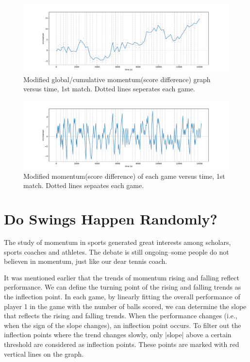 \documentclass[UTF8]{mcmthesis}
\begin{document}
	\begin{figure}[H]
		\centering
		\includegraphics[width=1.0\linewidth]{figs/fig2_0.pdf}
		\caption{Modified global/cumulative momentum(score difference) graph versus time, 1st match. Dotted lines seperates each game.}
		\label{fig:fig2_0}
	\end{figure}
	
	\begin{figure}[H]
		\centering
		\includegraphics[width=1.0\linewidth]{figs/fig3_0.pdf}
		\caption{Modified momentum(score difference) of each game versus time, 1st match. Dotted lines sepaates each game.}
		\label{fig:fig30}
	\end{figure}
	
	\section{Do Swings Happen Randomly?}
	The study of momentum in sports generated great interests among scholars, sports coaches and athletes. The debate is still ongoing--some people do not believen in momentum\cite{Hale_2021}, just like our dear tennis coach.
	
	It was mentioned earlier that the trends of momentum rising and falling reflect performance. We can define the turning point of the rising and falling trends as the inflection point. In each game, by linearly fitting the overall performance of player 1 in the game with the number of balls scored, we can determine the slope that reflects the rising and falling trends. When the performance changes (i.e., when the sign of the slope changes), an inflection point occurs. To filter out the inflection points where the trend changes slowly, only |slope| above a certain threshold are considered as inflection points. These points are marked with red vertical lines on the graph.
	
\end{document}
